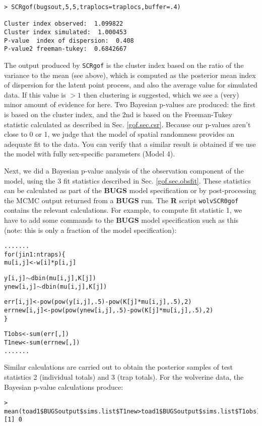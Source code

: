 {{\begin{verbatim}
> SCRgof(bugsout,5,5,traplocs=traplocs,buffer=.4)

Cluster index observed:  1.099822
Cluster index simulated:  1.000453
P-value  index of dispersion:  0.408
P-value2 freeman-tukey:  0.6842667
\end{verbatim}
}
The output produced by \mbox{\tt SCRgof} is the cluster index based on
the ratio of the variance to the mean
(see above), which is computed as the posterior mean index of
dispersion for the latent point process, and also the average value
for simulated data. If this value is $>1$ then clustering is
suggested, which we see a (very) minor amount of evidence for here. Two
Bayesian p-values are produced: the first is based on the cluster
index, and the 2nd is based on the Freeman-Tukey statistic calculated
as described in Sec. \ref{gof.sec.csr}.  Because our p-values aren't
close to 0 or 1, we judge that the model of spatial randomness
provides an adequate fit to the data. You can verify that a similar result is obtained if
we use the model with fully sex-specific parameters (Model 4).

Next, we did a Bayesian p-value analysis of the observation component
of the model, using the 3 fit statistics
described
in Sec. \ref{gof.sec.obsfit}.
These statistics can be calculated as part of
the {\bf BUGS} model specification or by post-processing the MCMC
output returned from a {\bf BUGS} run.
The {\bf R} script \mbox{\tt wolvSCR0gof} contains the relevant
calculations.  For example, to compute fit statistic 1, we have to add
some commands to the {\bf
  BUGS} model specification such as this (note: this is only a
fraction of the model specification):
\begin{alltt}
.......
for(j in 1:ntraps)\{
 mu[i,j] <- w[i]*p[i,j]

 y[i,j] \(\sim\) dbin(mu[i,j],K[j])
ynew[i,j] \(\sim\) dbin(mu[i,j],K[j])

err[i,j] <-  pow(pow(y[i,j],.5) - pow(K[j]*mu[i,j],.5),2)
errnew[i,j] <- pow(pow(ynew[i,j],.5) - pow(K[j]*mu[i,j],.5),2)
\}

T1obs <- sum(err[,])
T1new <- sum(errnew[,])
.......
\end{alltt}
Similar calculations are carried out to obtain the posterior samples
of test statistics 2 (individual totals) and 3 (trap totals). For the
wolverine data, the Bayesian p-value calculations produce:
{\small
\begin{verbatim}
> mean(toad1$BUGSoutput$sims.list$T1new>toad1$BUGSoutput$sims.list$T1obs)
[1] 0


\end{verbatim}}}
